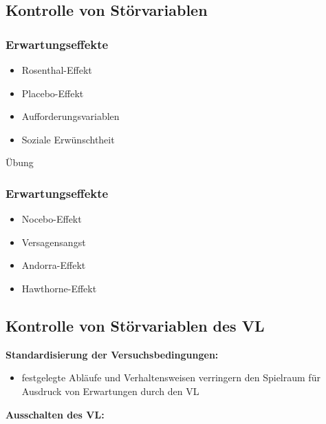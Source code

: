 \documentclass[
]{book}
\providecommand{\tightlist}{%
  \setlength{\itemsep}{0pt}\setlength{\parskip}{0pt}}
\begin{document}
\hypertarget{kontrolle-von-stuxf6rvariablen}{%
\subsection{Kontrolle von Störvariablen}\label{kontrolle-von-stuxf6rvariablen}}

\hypertarget{erwartungseffekte}{%
\subsubsection{Erwartungseffekte}\label{erwartungseffekte}}

\begin{itemize}
\item
  Rosenthal-Effekt
\item
  Placebo-Effekt
\item
  Aufforderungsvariablen
\item
  Soziale Erwünschtheit
\end{itemize}

Übung

\hypertarget{erwartungseffekte-1}{%
\subsubsection{Erwartungseffekte}\label{erwartungseffekte-1}}

\begin{itemize}
\item
  Nocebo-Effekt
\item
  Versagensangst
\item
  Andorra-Effekt
\item
  Hawthorne-Effekt
\end{itemize}

\hypertarget{kontrolle-von-stuxf6rvariablen-des-vl}{%
\subsection{Kontrolle von Störvariablen des VL}\label{kontrolle-von-stuxf6rvariablen-des-vl}}

\textbf{Standardisierung der Versuchsbedingungen:}

\begin{itemize}
\tightlist
\item
  festgelegte Abläufe und Verhaltensweisen verringern den Spielraum für Ausdruck von Erwartungen durch den VL
\end{itemize}

\textbf{Ausschalten des VL:}
\end{document}
